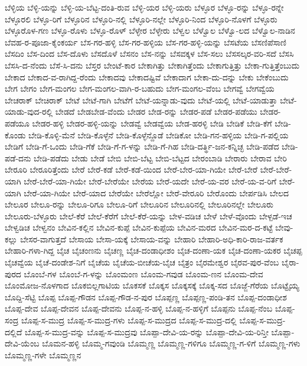 ಬೆಳ್ಳಿಯ
ಬೆಳ್ಳಿ-ಯನ್ನು
ಬೆಳ್ಳಿ-ಯ-ಬೆಟ್ಟ-ದಂತಿ-ರುವ
ಬೆಳ್ಳಿ-ಯರ
ಬೆಳ್ಳಿ-ಯರು
ಬೆಳ್ಳೂರ
ಬೆಳ್ಳೂ-ರನ್ನು
ಬೆಳ್ಳೂ-ರನ್ನೇ
ಬೆಳ್ಳೂರಲಿ
ಬೆಳ್ಳೂ-ರಿಗೆ
ಬೆಳ್ಳೂರಿನ
ಬೆಳ್ಳೂರಿ-ನಲ್ಲಿ
ಬೆಳ್ಳೂರಿ-ನಲ್ಲೇ
ಬೆಳ್ಳೂರಿ-ನಿಂದ
ಬೆಳ್ಳೂರಿ-ನೊಳಗೆ
ಬೆಳ್ಳೂರು
ಬೆಳ್ಳೂರೊಳ-ಗಣ
ಬೆಳ್ಳೂ-ರೊಳು
ಬೆಳ್ಳೂ-ರೊಳ್
ಬೆಳ್ಳೇರ
ಬೆಳ್ಳೇರು
ಬೆಳ್ವಲ
ಬೆಳ್ವೊಲ
ಬೆಳ್ವೊ-ಲದ
ಬೆಳ್ವೊಲ-ನಾಡಿನ
ಬೆವಹ-ರ-ಪೂಜಾ-ಕೈಂಕರ್ಯ
ಬೆಸ-ಗರ-ಹಳ್ಳಿ
ಬೆಸ-ಗರ-ಹಳ್ಳಿಯ
ಬೆಸ-ಗರ-ಹಳ್ಳಿ-ಯನ್ನು
ಬೆಸಟೆಯ
ಬೆಸಣಿಪೆಸಾಣಿ
ಬೆಸದಿಂ
ಬೆಸ-ದಿಂದ
ಬೆಸ-ದೊಳು
ಬೆಸದೊಳೆ
ಬೆಸನಂ
ಬೆಸ-ನನ್ನು
ಬೆಸವಕ್ಕಳ
ಬೆಸ-ಸಲು
ಬೆಸಸಲ್ಕರ-ವರಿ-ಸದೆ
ಬೆಸಸಿ
ಬೆಸಸಿ-ದ-ನೆಂದು
ಬೆಸೆ-ಸಿ-ದನು
ಬೆಸ್ತರ
ಬೇಂಟೆ-ಕಾರ
ಬೇಕಾಗಿತ್ತು
ಬೇಕಾಗಿತ್ತೆಂದು
ಬೇಕಾಗುತ್ತಿತ್ತು
ಬೇಕಾ-ಗುತ್ತಿತ್ತೆಂಬುದು
ಬೇಕಾದ
ಬೇಕಾದ-ವ-ರಾಗಿದ್ದ-ರೆಂದು
ಬೇಕಾದವು
ಬೇಕಾದಷ್ಟಿವೆ
ಬೇಕಾದಾಗ
ಬೇಕಾ-ದು-ದನ್ನು
ಬೇಕು
ಬೇಕೆಂಬುದು
ಬೇಗ
ಬೇಗಂ
ಬೇಗ-ಮಂಗಲ
ಬೇಗ-ಮಂಗಲ-ವಾಗಿ-ರ-ಬಹುದು
ಬೇಗ-ಮಂಗಲ-ವೆಂಬ
ಬೇಗವ್ವೆ
ಬೇಗವ್ವೆಯ
ಬೇಚರಾಕ್
ಬೇಚಿರಾಕ್
ಬೇಟೆ
ಬೇಟೆ-ಗಾಗಿ
ಬೇಟೆಗೆ
ಬೇಟೆ-ಯನ್ನಾಡು-ವುದು
ಬೇಟೆ-ಯಲ್ಲಿ
ಬೇಟೆ-ಯಾಡುತ್ತಾ
ಬೇಟೆ-ಯಾಡು-ವುದ-ರಲ್ಲಿ
ಬೇಡದೆ
ಬೇಡಬೇಡ-ವೆಂದು
ಬೇಡರ
ಬೇಡ-ರನ್ನು
ಬೇಡರ-ಪಡೆ
ಬೇಡರ-ಪಡೆಯು
ಬೇಡರ-ಪಡೆಯೂ
ಬೇಡರ-ಹಳ್ಳಿ
ಬೇಡರ-ಹಳ್ಳಿ-ಯನ್ನು
ಬೇಡವ್ವೆ
ಬೇಡವ್ವೆಯ
ಬೇಡ-ಹರಳ್ಳಿ
ಬೇಡಿ
ಬೇಡಿಕೆ
ಬೇಡಿ-ಕೆಗೆ
ಬೇಡಿ-ಕೊಂಡು
ಬೇಡಿ-ಕೊಳ್ಳಿ-ಮೆನೆ
ಬೇಡಿ-ಕೊಳ್ಳೆನೆ
ಬೇಡಿ-ಕೊಳ್ಳೆನ್ದೊಡೆ
ಬೇಡಿಕೋ
ಬೇಡಿ-ಗನ-ಹಳ್ಳಿಯ
ಬೇಡಿ-ಗ-ಪಲ್ಲಿಯ
ಬೇಡಿಗೆ
ಬೇಡಿ-ಗೆ-ಒಂದು
ಬೇಡಿ-ಗೆಕೆ
ಬೇಡಿ-ಗೆ-ಗ-ಳನ್ನು
ಬೇಡಿ-ಗೆ-ಗಿಹ
ಬೇಡಿ-ದರ್ತ್ಥಿ-ಜನ-ಕನ್ನಿಚ್ಛ
ಬೇಡಿ-ಪಡೆದ
ಬೇಡಿ-ಪಡೆ-ದನು
ಬೇಡಿ-ಪಡೆದು
ಬೇಡು
ಬೇಡೆ
ಬೇಬಿ
ಬೇಬಿ-ಬೆಟ್ಟ
ಬೇಬಿ-ಬೆಟ್ಟದ
ಬೇರಂಬಾಡಿ
ಬೇರಾರು
ಬೇರಾವ
ಬೇರಿ
ಬೇರೂರಿ
ಬೇರೂರಿತ್ತೆಂದು
ಬೇರೆ
ಬೇರೆ-ಕಡೆ
ಬೇರೆ-ಕಡೆ-ಯಿಂದ
ಬೇರೆ-ಬೇರ-ಯಾ-ಗಿಯೇ
ಬೇರೆ-ಬೇರೆ
ಬೇರೆ-ಬೇರೆ-ಯಾಗಿ
ಬೇರೆ-ಬೇರೆ-ಯಾ-ಗಿಯೇ
ಬೇರೆ-ಬೇರೆಯೇ
ಬೇರೆಯ
ಬೇರೆ-ಯದೇ
ಬೇರೆ-ಯ-ವರ
ಬೇರೆ-ಯ-ವ-ರಿಗೆ
ಬೇರೆ-ಯಾಗಿ
ಬೇರೆ-ಯಾ-ಗಿಯೇ
ಬೇರೆ-ಯಾದ
ಬೇರೆಯೇ
ಬೇರೆಲ್ಲೋ
ಬೇರೆ-ವೇರೂರಿ
ಬೇರೊಂದು
ಬೇರ್ಪಡಿಸಿ
ಬೇಲದ
ಬೇಲೂರ
ಬೇಲೂ-ರನ್ನು
ಬೇಲೂ-ರಿಗೂ
ಬೇಲೂ-ರಿಗೆ
ಬೇಲೂರಿನ
ಬೇಲೂರಿನಲ್ಲಿ
ಬೇಲೂರಿನಲ್ಲೇ
ಬೇಲೂರು
ಬೇಲೂರು-ಬೆಳ್ಳೂರು
ಬೇಲೆ-ಕೆರೆ
ಬೇಲೆ-ಕೆರೆಗೆ
ಬೇಲೆ-ಕೆರೆ-ಯನ್ನು
ಬೇಳ-ವಡಿಚ
ಬೇಳೆ
ಬೇಳೆ-ವೊಂದು
ಬೇಳ್ಪಡೆ-ಇಚ
ಬೇಳ್ವಡಿಚ
ಬೇಳ್ವನಂ
ಬೇವಿನ-ಕಲ್ಲಿನ
ಬೇವಿನ-ಕುಪ್ಪೆ
ಬೇವಿನ-ಕುಪ್ಪೆಯ
ಬೇವಿನ-ಮರದ
ಬೇವಿನ-ಮರ-ದ-ಕಟ್ಟೆ
ಬೇವು-ಕಲ್ಲು
ಬೇಸರ-ವಾಗುತ್ತದೆ
ಬೇಸಾಯ
ಬೇಸಾ-ಯಕ್ಕೆ
ಬೇಸಾಯ-ವನ್ನು
ಬೇಹಾರಿ
ಬೇಹಾರಿ-ಅಧಿ-ಕಾರಿ-ರಾಜ-ವರ್ತಕ
ಬೇಹಾರಿ-ಗಳಾ-ಗಿದ್ದ
ಬೈಚ
ಬೈಚಂಣನು
ಬೈಚಣ್ಣ
ಬೈಚ-ದಂಡಾಧೀಶಂ
ಬೈಚ-ದಂಣಾ-ಯಕ
ಬೈಚ-ದಂಣಾ-ಯಕರ
ಬೈಚಪ್ಪ
ಬೈಚವ್ವೆಯ
ಬೈಚೆ-ದಂಡೇಶ-ನಿಗೆ
ಬೈಚೆಯ
ಬೈಚೆಯ-ಬೀಚೆಯ-ಬೈಚ
ಬೈತ್ರಂ
ಬೈರಮೇಶ್ವರ
ಬೈರವ-ಪುರ-ವೆಂಬ
ಬೈರಾ-ಪುರದ
ಬೊಂಬೆ-ಗಳ
ಬೊಂಬೆ-ಗ-ಳನ್ನು
ಬೊಂಮಂಣ
ಬೊಂಮ-ಗವುಡ
ಬೊಂಮ-ಣನ
ಬೊಂಮ-ದೇವ
ಬೊಂಮೋಜ-ನೊಳಗಾದ
ಬೊಕಬಿಲ್ಲಗಾಟಿಯ
ಬೊಕಸಕೆ
ಬೊಕ್ಕಸ
ಬೊಕ್ಕಸಕ್ಕೆ
ಬೊಕ್ಕ-ಸದ
ಬೊಜ್ಜೆ-ಗೆರೆಯ
ಬೊಟ್ಟೈಯ್ಯ
ಬೊದ್ದಿ-ಸೆಟ್ಟಿ
ಬೊಪ್ಪ
ಬೊಪ್ಪ-ಗೌಡನ
ಬೊಪ್ಪ-ಗೌಡ-ನ-ಪುರ
ಬೊಪ್ಪಣ್ಣ
ಬೊಪ್ಪಣ್ಣ-ಪಂಡಿ-ತನ
ಬೊಪ್ಪ-ದಂಡಾಧೀಶ
ಬೊಪ್ಪ-ದೇವ
ಬೊಪ್ಪ-ದೇವನ
ಬೊಪ್ಪ-ದೇವನು
ಬೊಪ್ಪ-ನ-ಹಳ್ಳಿ
ಬೊಪ್ಪ-ನ-ಹಳ್ಳಿಗೆ
ಬೊಪ್ಪನು
ಬೊಪ್ಪ-ನೆಂಬ
ಬೊಪ್ಪ-ಸಂದ್ರ
ಬೊಪ್ಪ-ಸ-ಮುದ್ರ
ಬೊಪ್ಪ-ಸ-ಮುದ್ರ-ಗಳು
ಬೊಪ್ಪ-ಸ-ಮುದ್ರದ
ಬೊಪ್ಪ-ಸ-ಮುದ್ರ-ದಲ್ಲಿ
ಬೊಪ್ಪ-ಸ-ಮುದ್ರ-ದಲ್ಲಿದೆ
ಬೊಪ್ಪ-ಸ-ಮುದ್ರ-ವನ್ನು
ಬೊಪ್ಪ-ಸ-ಮುದ್ರವು
ಬೊಪ್ಪಾ-ದೇವಿ-ಯ-ರನ್ನು
ಬೊಪ್ಪಾ-ದೇವಿ-ಯ-ರಿನ್ತೀ
ಬೊಪ್ಪಾ-ದೇವಿ-ಯೆಂಬ
ಬೊಮನ-ಹಳ್ಳಿ
ಬೊಮ್ಮ-ಗವುಂಡಿ
ಬೊಮ್ಮಣ್ಣ
ಬೊಮ್ಮಣ್ಣ-ಗಳಿಗೂ
ಬೊಮ್ಮಣ್ಣ-ಗ-ಳಿಗೆ
ಬೊಮ್ಮಣ್ಣ-ಗಳು
ಬೊಮ್ಮಣ್ಣ-ಗಳೇ
ಬೊಮ್ಮಣ್ಣನ
